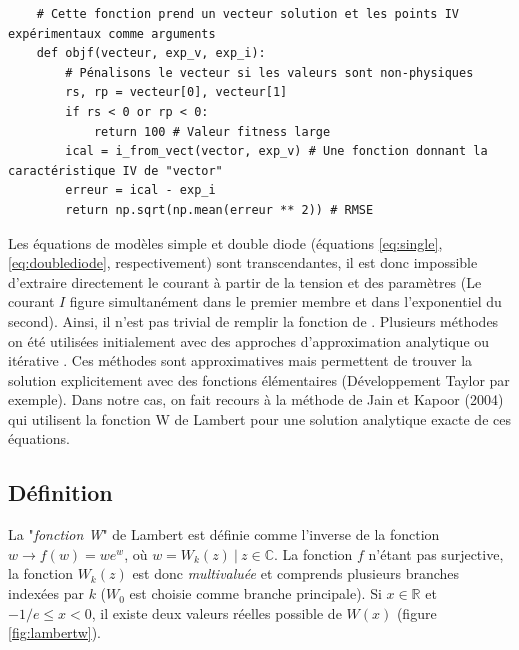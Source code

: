 \noindent
\begin{minipage}{\linewidth}
\begin{verbatim}
    # Cette fonction prend un vecteur solution et les points IV expérimentaux comme arguments
    def objf(vecteur, exp_v, exp_i):
        # Pénalisons le vecteur si les valeurs sont non-physiques
        rs, rp = vecteur[0], vecteur[1]
        if rs < 0 or rp < 0:
            return 100 # Valeur fitness large
        ical = i_from_vect(vector, exp_v) # Une fonction donnant la caractéristique IV de "vector"
        erreur = ical - exp_i
        return np.sqrt(np.mean(erreur ** 2)) # RMSE         
\end{verbatim}
\end{minipage}
\vspace*{12pt}

Les équations de modèles simple et double diode (équations \ref{eq:single}, \ref{eq:doublediode}, respectivement) sont transcendantes, il est donc impossible d'extraire directement le courant à partir de la tension et des paramètres (Le courant $I$ figure simultanément dans le premier membre et dans l'exponentiel du second). Ainsi, il n'est pas trivial de remplir la fonction de . Plusieurs méthodes on été utilisées initialement avec des approches d'approximation analytique ou itérative \cite{Shur1991,AbuelmaAtti1992,Datta1992}. Ces méthodes sont approximatives mais permettent de trouver la solution explicitement avec des fonctions élémentaires (Développement Taylor par exemple). Dans notre cas, on fait recours à la méthode de Jain et Kapoor (2004) \cite{Jain2004, Lun2015} qui utilisent la fonction W de Lambert pour une solution analytique exacte de ces équations.

\subsection{Définition}
La "\textit{fonction W}" de Lambert est définie comme l'inverse de la fonction $w \rightarrow f(w) =  w e^w$, où $w = W_k(z)\ |\ z \in \mathbb{C}$. La fonction $f$ n'étant pas surjective, la fonction $W_k(z)$ est donc \textit{multivaluée} et comprends plusieurs branches indexées par $k$ ($W_0$ est choisie comme branche principale). Si $x \in \mathbb{R}$ et $-1/e \leq x < 0$, il existe deux valeurs réelles possible de $W(x)$ (figure \ref{fig:lambertw}).

